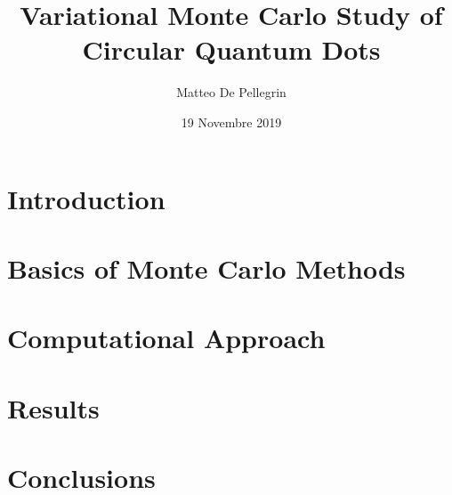 \documentclass[11pt]{book}
\title{Variational Monte Carlo Study of Circular Quantum Dots}
\author{Matteo De Pellegrin}
\date{19 Novembre 2019}
\begin{document}
\maketitle
\thispagestyle{empty}

\frontmatter
\tableofcontents
\listoffigures
\begingroup
\let\cleardoublepage\relax
\listoftables
\endgroup

\mainmatter
\chapter{Introduction}


\chapter{Basics of Monte Carlo Methods}


\chapter{Computational Approach}


\chapter{Results}


\chapter{Conclusions}


\printbibliography
\end{document}
